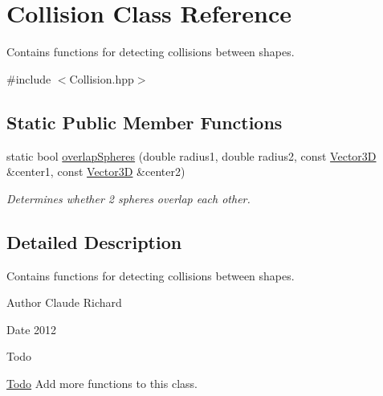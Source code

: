 \hypertarget{class_collision}{\section{Collision Class Reference}
\label{class_collision}
}


Contains functions for detecting collisions between shapes.  




{\ttfamily \#include $<$Collision.\-hpp$>$}

\subsection*{Static Public Member Functions}
\begin{DoxyCompactItemize}
\item 
static bool \hyperlink{class_collision_a126109ad2a3bdfca64972ec278980f66}{overlap\-Spheres} (double radius1, double radius2, const \hyperlink{class_vector3_d}{Vector3\-D} \&center1, const \hyperlink{class_vector3_d}{Vector3\-D} \&center2)
\begin{DoxyCompactList}\small\item\em Determines whether 2 spheres overlap each other. \end{DoxyCompactList}\end{DoxyCompactItemize}


\subsection{Detailed Description}
Contains functions for detecting collisions between shapes. 

\begin{DoxyAuthor}{Author}
Claude Richard 
\end{DoxyAuthor}
\begin{DoxyDate}{Date}
2012 
\end{DoxyDate}
\begin{DoxyRefDesc}{Todo}
\item[\hyperlink{todo__todo000001}{Todo}]Add more functions to this class. \end{DoxyRefDesc}


